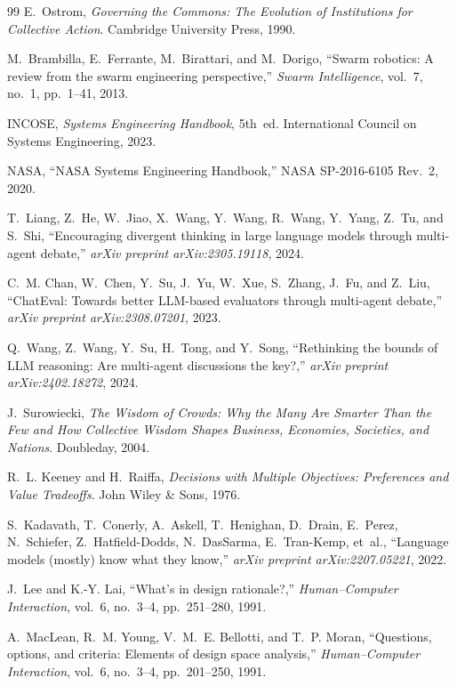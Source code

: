 \documentclass[11pt,a4paper]{article}
\begin{document}
\begin{thebibliography}{99}
E.~Ostrom, \emph{Governing the Commons: The Evolution of Institutions for Collective Action}. Cambridge University Press, 1990.

M.~Brambilla, E.~Ferrante, M.~Birattari, and M.~Dorigo, ``Swarm robotics: A review from the swarm engineering perspective,'' \emph{Swarm Intelligence}, vol.~7, no.~1, pp.~1--41, 2013.

INCOSE, \emph{Systems Engineering Handbook}, 5th~ed. International Council on Systems Engineering, 2023.

NASA, ``NASA Systems Engineering Handbook,'' NASA SP-2016-6105 Rev.~2, 2020.

T.~Liang, Z.~He, W.~Jiao, X.~Wang, Y.~Wang, R.~Wang, Y.~Yang, Z.~Tu, and S.~Shi, ``Encouraging divergent thinking in large language models through multi-agent debate,'' \emph{arXiv preprint arXiv:2305.19118}, 2024.

C.~M. Chan, W.~Chen, Y.~Su, J.~Yu, W.~Xue, S.~Zhang, J.~Fu, and Z.~Liu, ``ChatEval: Towards better LLM-based evaluators through multi-agent debate,'' \emph{arXiv preprint arXiv:2308.07201}, 2023.

Q.~Wang, Z.~Wang, Y.~Su, H.~Tong, and Y.~Song, ``Rethinking the bounds of LLM reasoning: Are multi-agent discussions the key?,'' \emph{arXiv preprint arXiv:2402.18272}, 2024.

J.~Surowiecki, \emph{The Wisdom of Crowds: Why the Many Are Smarter Than the Few and How Collective Wisdom Shapes Business, Economies, Societies, and Nations}. Doubleday, 2004.

R.~L. Keeney and H.~Raiffa, \emph{Decisions with Multiple Objectives: Preferences and Value Tradeoffs}. John Wiley \& Sons, 1976.

S.~Kadavath, T.~Conerly, A.~Askell, T.~Henighan, D.~Drain, E.~Perez, N.~Schiefer, Z.~Hatfield-Dodds, N.~DasSarma, E.~Tran-Kemp, et~al., ``Language models (mostly) know what they know,'' \emph{arXiv preprint arXiv:2207.05221}, 2022.

J.~Lee and K.-Y. Lai, ``What's in design rationale?,'' \emph{Human--Computer Interaction}, vol.~6, no.~3--4, pp.~251--280, 1991.

A.~MacLean, R.~M. Young, V.~M.~E. Bellotti, and T.~P. Moran, ``Questions, options, and criteria: Elements of design space analysis,'' \emph{Human--Computer Interaction}, vol.~6, no.~3--4, pp.~201--250, 1991.

\end{thebibliography}
\end{document}
